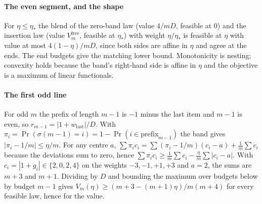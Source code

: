 
\paragraph{The even segment, and the shape} For $\eta\le\eta_{*}$ the blend of the zero-band
law (value $4/mD$, feasible at $0$) and the insertion law (value $V^{\mathrm{free}}_{m}$,
feasible at $\eta_{*}$) with weight $\eta/\eta_{*}$ is feasible at $\eta$ with value at most
$4(1-\eta)/mD$, since both sides are affine in $\eta$ and agree at the ends. The end budgets
give the matching lower bound. Monotonicity is nesting; convexity holds because the band's
right-hand side is affine in $\eta$ and the objective is a maximum of linear functionals.


\paragraph{The first odd line} For odd $m$ the prefix of
length $m-1$ is $-1$ minus the last item and $m-1$ is even, so
$r_{m-1}=|1+w_{\mathrm{last}}|/D$. With $\pi_{i}=\Pr(\sigma(m-1)=i)=1-\Pr(i\in
\mathrm{prefix}_{m-1})$ the band gives $|\pi_{i}-1/m|\le\eta/m$. For any centre $a$,
$\sum\pi_{i}c_{i}=\sum(\pi_{i}-1/m)(c_{i}-a)+\frac1m\sum c_{i}$ because the deviations sum
to zero, hence $\sum\pi_{i}c_{i}\ge\frac1m\sum c_{i}-\frac\eta m\sum|c_{i}-a|$. With
$c_{i}=|1+g_{i}|\in\{2,0,2,4\}$ on the weights $-3,-1,+1,+3$ and $a=2$, the sums are $m+3$
and $m+1$. Dividing by $D$ and bounding the maximum over budgets below by budget $m-1$ gives
$V_{m}(\eta)\ge(m+3-(m+1)\eta)/m(m+4)$ for every feasible law, hence for the value.


